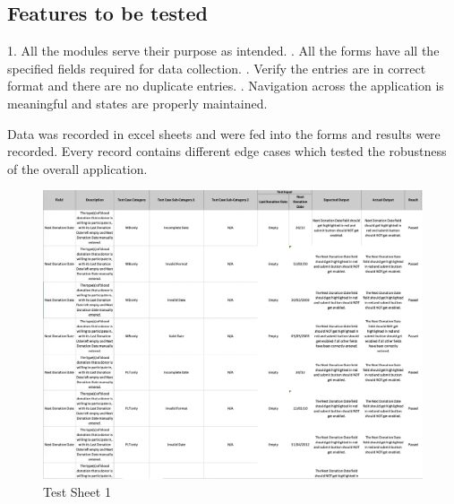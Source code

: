 \documentclass[BTech]{srmuthesis}
\begin{document}
\subsection{Features to be tested}
1. All the modules serve their purpose as intended.
. All the forms have all the specified fields required for data collection.
. Verify the entries are in correct format and there are no duplicate entries.
. Navigation across the application is meaningful and states are properly maintained.
\newline

Data was recorded in excel sheets and were fed into the forms and results were recorded. Every record contains different edge cases which tested the robustness of the overall application.

\begin{figure}[H]
	\centering
	\includegraphics[scale=0.35]{testdone3.png}
	\caption{Test Sheet 1}
\end{figure}
\end{document}
